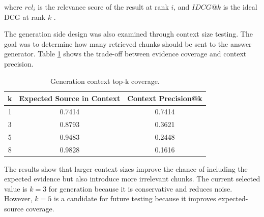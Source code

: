 where $rel_i$ is the relevance score of the result at rank $i$, and $IDCG@k$ is the ideal DCG at rank $k$ \cite{jarvelin2002ndcg}.

The generation side design was also examined through context size testing. The goal was to determine how many retrieved chunks should be sent to the answer generator. Table \ref{tab:topk_context_updated} shows the trade-off between evidence coverage and context precision.

\begin{table}[h]
\centering
\caption{Generation context top-k coverage.}
\label{tab:topk_context_updated}
\begin{tabular}{|c|c|c|}
\hline
\textbf{k} & \textbf{Expected Source in Context} & \textbf{Context Precision@k} \\
\hline
1 & 0.7414 & 0.7414 \\
\hline
3 & 0.8793 & 0.3621 \\
\hline
5 & 0.9483 & 0.2448 \\
\hline
8 & 0.9828 & 0.1616 \\
\hline
\end{tabular}
\end{table}

The results show that larger context sizes improve the chance of including the expected evidence but also introduce more irrelevant chunks. The current selected value is $k=3$ for generation because it is conservative and reduces noise. However, $k=5$ is a candidate for future testing because it improves expected-source coverage.
